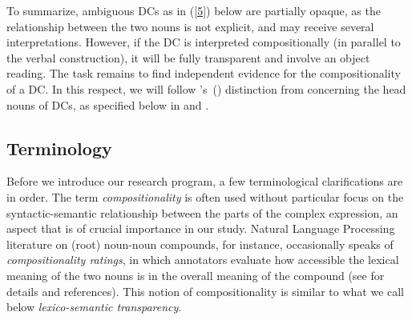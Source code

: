 \documentclass[output=paper]{langsci/langscibook}
\begin{document}
\begin{exe}
\end{exe}


To summarize, ambiguous DCs as in (\ref{5}) below are partially opaque, as the relationship between the two nouns is not explicit, and may receive several interpretations.
However, if the DC is interpreted compositionally (in parallel to the verbal construction), it will be fully transparent and involve an object reading. The task remains to find independent evidence for the compositionality of a DC. In this respect, we will follow \citeauthor{grimshaw:90}'s~(\citeyear{grimshaw:90}) distinction from  concerning the head nouns of DCs, as specified below in  and .

\begin{exe}
\end{exe}


\subsection{Terminology}
 Before we introduce our research program, a few terminological clarifications are in order. The term \textit{compositionality} is often used without particular focus on the syntactic-semantic relationship between the parts of the complex expression, an aspect that is of crucial importance in our study. Natural Language Processing literature on (root) noun-noun compounds, for instance, occasionally speaks of \textit{compositionality ratings}, in which annotators evaluate how accessible the lexical meaning of the two nouns is in the overall meaning of the compound (see  for details and references). This notion of compositionality is similar to what we call below \textit{lexico-semantic transparency}.
\end{document}
